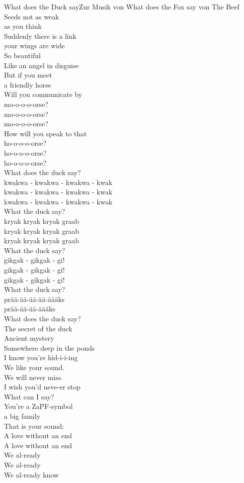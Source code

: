 \begin{lied}{What does the Duck say}{Zur Musik von 
What does the Fox say von The Beef Seeds}
not as weak\\
as you think\\
Suddenly there is a link\\
your wings are wide\\
So beautiful\\
Like an angel in disguise\\
But if you meet\\
a friendly horse\\
Will you communicate by\\
mo-o-o-o-orse?\\
mo-o-o-o-orse?\\
mo-o-o-o-orse?\\
How will you speak to that\\
ho-o-o-o-orse?\\
ho-o-o-o-orse?\\
ho-o-o-o-orse?\\
What does the duck say?\\
kwakwa - kwakwa - kwakwa - kwak\\
kwakwa - kwakwa - kwakwa - kwak\\
kwakwa - kwakwa - kwakwa - kwak\\
What the duck say?\\
kryak kryak kryak graab\\
kryak kryak kryak graab\\
kryak kryak kryak graab\\
What the duck say?\\
gikgak - gikgak - gi!\\
gikgak - gikgak - gi!\\
gikgak - gikgak - gi!\\
What the duck say?\\
prää-ää-ää-ää-äääks\\
prää-ää-ää-äääks\\
What does the duck say?\\
The secret of the duck\\
Ancient mystery\\
Somewhere deep in the ponds\\
I know you're hid-i-i-ing\\
We like your sound.\\
We will never miss.\\
I wish you’d neve-er stop\\
What can I say?\\
You’re a ZaPF-symbol\\
a big family\\
That is your sound:\\
A love without an end\\
A love without an end\\
We al-ready\\
We al-ready\\
We al-ready know\\
\end{lied}